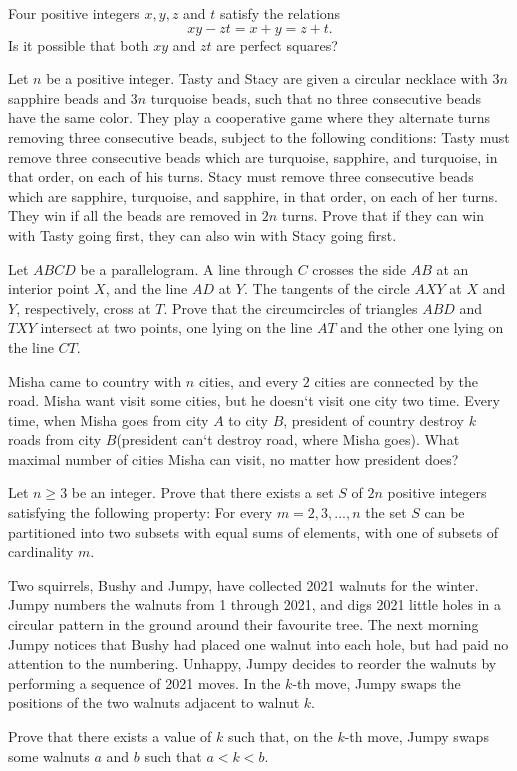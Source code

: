 \documentclass[11pt]{scrartcl}
\begin{document}
\begin{problem}[4678973565823282552]
Four positive integers $x,y,z$ and $t$ satisfy the relations
\[ xy - zt = x + y = z + t. \]Is it possible that both $xy$ and $zt$ are perfect squares?
\end{problem}
\begin{problem}[692237787009642]
	Let $n$ be a positive integer. Tasty and Stacy are given a circular necklace with $3n$ sapphire beads and $3n$ turquoise beads, such that no three consecutive beads have the same color. They play a cooperative game where they alternate turns removing three consecutive beads, subject to the following conditions:
Tasty must remove three consecutive beads which are turquoise, sapphire, and turquoise, in that order, on each of his turns.
Stacy must remove three consecutive beads which are sapphire, turquoise, and sapphire, in that order, on each of her turns.
They win if all the beads are removed in $2n$ turns. Prove that if they can win with Tasty going first, they can also win with Stacy going first.
\end{problem}
\begin{problem}[579228243242060]
Let $ABCD$ be a parallelogram. A line through $C$ crosses the side $AB$ at an interior point $X$,
and the line $AD$ at $Y$. The tangents of the circle $AXY$ at $X$ and $Y$, respectively, cross at $T$.
Prove that the circumcircles of triangles $ABD$ and $TXY$ intersect at two points, one lying on the line $AT$ and the other one lying on the line $CT$.
\end{problem}
\begin{problem}[308215997593136]
Misha came to country with $n$ cities, and every $2$ cities are connected by the road. Misha want visit some cities, but he doesn`t visit one city two time. Every time, when Misha goes from city $A$ to city $B$, president of country destroy $k$ roads from city $B$(president can`t destroy road, where Misha goes). What maximal number of cities Misha can visit, no matter how president does?
\end{problem}
\begin{problem}[8059760967121829853]
	Let $n\geqslant 3$ be an integer. Prove that there exists a set $S$ of $2n$ positive integers satisfying the following property: For every $m=2,3,...,n$ the set $S$ can be partitioned into two subsets with equal sums of elements, with one of subsets of cardinality $m$.
\end{problem}
\begin{problem}[669395675904242]
	Two squirrels, Bushy and Jumpy, have collected 2021 walnuts for the winter. Jumpy numbers the walnuts from 1 through 2021, and digs 2021 little holes in a circular pattern in the ground around their favourite tree. The next morning Jumpy notices that Bushy had placed one walnut into each hole, but had paid no attention to the numbering. Unhappy, Jumpy decides to reorder the walnuts by performing a sequence of 2021 moves. In the $k$-th move, Jumpy swaps the positions of the two walnuts adjacent to walnut $k$.

Prove that there exists a value of $k$ such that, on the $k$-th move, Jumpy swaps some walnuts $a$ and $b$ such that $a<k<b$.
\end{problem}
\end{document}
